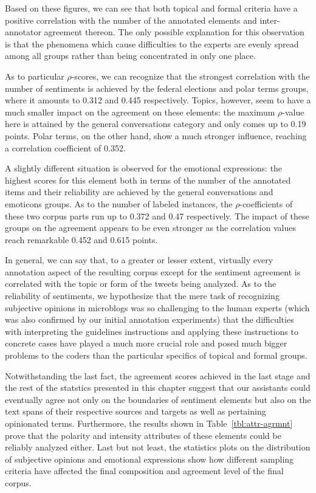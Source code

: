 Based on these figures, we can see that both topical and formal
criteria have a positive correlation with the number of the annotated
elements and inter-annotator agreement thereon.  The only possible
explanation for this observation is that the phenomena which cause
difficulties to the experts are evenly spread among all groups rather
than being concentrated in only one place.

As to particular $\rho$-scores, we can recognize that the strongest
correlation with the number of sentiments is achieved by the federal
elections and polar terms groups, where it amounts to 0.312 and 0.445
respectively.  Topics, however, seem to have a much smaller impact on
the agreement on these elements: the maximum $\rho$-value here is
attained by the general conversations category and only comes up to
0.19 points.  Polar terms, on the other hand, show a much stronger
influence, reaching a correlation coefficient of 0.352.

A slightly different situation is observed for the emotional
expressions: the highest scores for this element both in terms of the
number of the annotated items and their reliability are achieved by
the general conversations and emoticons groups.  As to the number of
labeled instances, the $\rho$-coefficients of these two corpus parts
run up to 0.372 and 0.47 respectively.  The impact of these groups on
the agreement appears to be even stronger as the correlation values
reach remarkable 0.452 and 0.615 points.

In general, we can say that, to a greater or lesser extent, virtually
every annotation aspect of the resulting corpus except for the
sentiment agreement is correlated with the topic or form of the tweets
being analyzed.  As to the reliability of sentiments, we hypothesize
that the mere task of recognizing subjective opinions in microblogs
was so challenging to the human experts (which was also confirmed by
our initial annotation experiments) that the difficulties with
interpreting the guidelines instructions and applying these
instructions to concrete cases have played a much more crucial role
and posed much bigger problems to the coders than the particular
specifics of topical and formal groups.

Notwithstanding the last fact, the agreement scores achieved in the
last stage and the rest of the statstics presented in this chapter
suggest that our assistants could eventually agree not only on the
boundaries of sentiment elements but also on the text spans of their
respective sources and targets as well as pertaining opinionated
terms.  Furthermore, the results shown in Table~\ref{tbl:attr-agrmnt}
prove that the polarity and intensity attributes of these elements
could be reliably analyzed either.  Last but not least, the statistics
plots on the distribution of subjective opinions and emotional
expressions show how different sampling criteria have affected the
final composition and agreement level of the final corpus.

